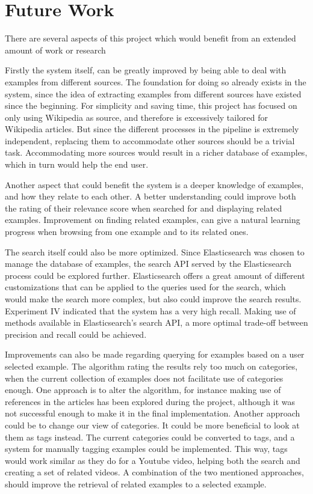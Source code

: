 \section{Future Work}
There are several aspects of this project which would benefit from an extended amount of work or research

Firstly the system itself, can be greatly improved by being able to deal with examples from different sources. The foundation for doing so already exists in the system, since the idea of extracting examples from different sources have existed since the beginning. For simplicity and saving time, this project has focused on only using Wikipedia as source, and therefore is excessively tailored for Wikipedia articles. But since the different processes in the pipeline is extremely independent, replacing them to accommodate other sources should be a trivial task. Accommodating more sources would result in a richer database of examples, which in turn would help the end user.

Another aspect that could benefit the system is a deeper knowledge of examples, and how they relate to each other. A better understanding could improve both the rating of their relevance score when searched for and displaying related examples. Improvement on finding related examples, can give a natural learning progress when browsing from one example and to its related ones.

The search itself could also be more optimized. Since Elasticsearch was chosen to manage the database of examples, the search API served by the Elasticsearch process could be explored further. Elasticsearch offers a great amount of different customizations that can be applied to the queries used for the search, which would make the search more complex, but also could improve the search results. Experiment IV indicated that the system has a very high recall. Making use of methods available in Elasticsearch's search API, a more optimal trade-off between precision and recall could be achieved. 

Improvements can also be made regarding querying for examples based on a user selected example. The algorithm rating the results rely too much on categories, when the current collection of examples does not facilitate use of categories enough. One approach is to alter the algorithm, for instance making use of references in the articles has been explored during the project, although it was not successful enough to make it in the final implementation. Another approach could be to change our view of categories. It could be more beneficial to look at them as tags instead. The current categories could be converted to tags, and a system for manually tagging examples could be implemented. This way, tags would work similar as they do for a Youtube video, helping both the search and creating a set of related videos. A combination of the two mentioned approaches, should improve the retrieval of related examples to a selected example.

